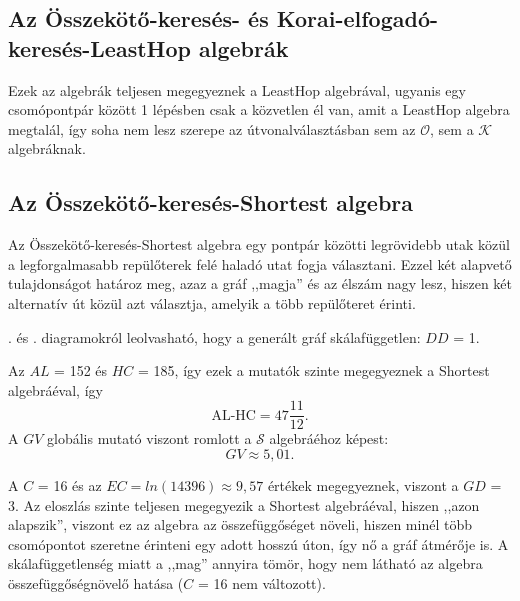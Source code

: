     \subsection{Az Összekötő-keresés- és Korai-elfogadó-keresés-LeastHop algebrák}
    Ezek az algebrák teljesen megegyeznek a LeastHop algebrával, ugyanis egy csomópontpár között 1 lépésben csak a közvetlen él van, amit a LeastHop algebra megtalál, így soha nem lesz szerepe az útvonalválasztásban sem az $\mathcal{O}$, sem a $\mathcal{K}$ algebráknak.

    \subsection{Az Összekötő-keresés-Shortest algebra}
    Az Összekötő-keresés-Shortest algebra egy pontpár közötti legrövidebb utak közül a legforgalmasabb repülőterek felé haladó utat fogja választani. Ezzel két alapvető tulajdonságot határoz meg, azaz a gráf ,,magja'' és az élszám nagy lesz, hiszen két alternatív út közül azt választja, amelyik a több repülőteret érinti.\\

    . és . diagramokról leolvasható, hogy a generált gráf skálafüggetlen: $DD$ = 1.

    Az $AL$ = 152 és $HC$ = 185, így ezek a mutatók szinte megegyeznek a Shortest algebráéval, így $$\text{AL-HC}=47\frac{11}{12}.$$ A $GV$ globális mutató viszont romlott a $\mathcal{S}$ algebráéhoz képest: $$GV \approx 5,01.$$

    A $C$ = 16 és az $EC = ln(14396) \approx 9,57$ értékek megegyeznek, viszont a $GD$ = 3. Az eloszlás szinte teljesen megegyezik a Shortest algebráéval, hiszen ,,azon alapszik'', viszont ez az algebra az összefüggőséget növeli, hiszen minél több csomópontot szeretne érinteni egy adott hosszú úton, így nő a gráf átmérője is. A skálafüggetlenség miatt a ,,mag'' annyira tömör, hogy nem látható az algebra összefüggőségnövelő hatása ($C$ = 16 nem változott).

